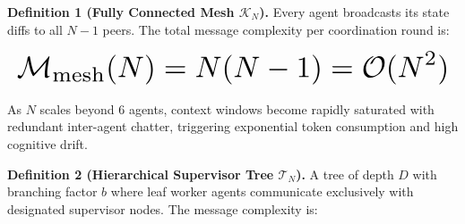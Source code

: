 \documentclass[10pt,journal,compsoc,twocolumn]{IEEEtran}
\begin{document}
\textbf{Definition 1 (Fully Connected Mesh $\mathcal{K}_N$).} Every agent broadcasts its state diffs to all $N-1$ peers. The total message complexity per coordination round is:


























\begin{equation}
\resizebox{\columnwidth}{!}{$\displaystyle
\begin{aligned}
\mathcal{M}_{\text{mesh}}(N) = N(N - 1) = \mathcal{O}(N^2)
\end{aligned}
$}
\end{equation}


























As $N$ scales beyond 6 agents, context windows become rapidly saturated with redundant inter-agent chatter, triggering exponential token consumption and high cognitive drift.

\textbf{Definition 2 (Hierarchical Supervisor Tree $\mathcal{T}_N$).} A tree of depth $D$ with branching factor $b$ where leaf worker agents communicate exclusively with designated supervisor nodes. The message complexity is:
\end{document}
